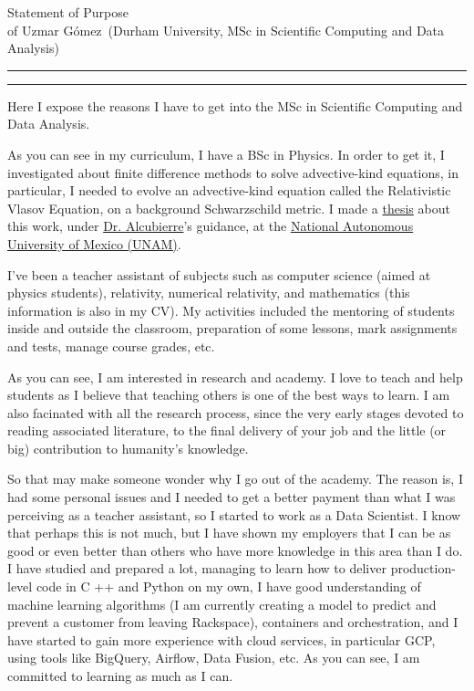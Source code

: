 \documentclass{article}
\newcommand{\soptitle}{Statement of Purpose}
\newcommand{\yourname}{Uzmar G\'omez}
\begin{document}
\begin{center}\LARGE\soptitle\\
\large of \yourname\ (Durham University, MSc in Scientific Computing and Data Analysis)
\end{center}

\hrule
\vspace{1pt}
\hrule height 1pt

\bigskip

Here I expose the reasons I have to get into the MSc in Scientific Computing and Data Analysis.

As you can see in my curriculum,  I have a BSc in Physics. In order to get it, I investigated about finite difference methods to solve advective-kind equations, in particular, I needed to evolve an advective-kind equation called the Relativistic Vlasov Equation, on a background Schwarzschild metric. I made a \href{http://oreon.dgbiblio.unam.mx/F/YF3LAD8UIUFR2XRPDE3H6JM2MI44M8RY8QX1RH7K429163KKEV-19694?func=find-b&request=uzmar&find_code=WRD&adjacent=N&local_base=TES01&x=65&y=13&filter_code_2=WYR&filter_request_2=&filter_code_3=WYR&filter_request_3=}{thesis} about this work, under \href{https://sigi.nucleares.unam.mx/sgiicn/people/user/view/id/8}{Dr. Alcubierre}'s guidance, at the \href{https://www.unam.mx/}{National Autonomous University of Mexico (UNAM)}. 

I've been a teacher assistant of subjects such as computer science (aimed at physics students), relativity, numerical relativity, and mathematics (this information is also in my CV). My activities included the mentoring of students inside and outside the classroom, preparation of some lessons, mark assignments and tests, manage course grades, etc. 

As you can see, I am interested in research and academy. I love to teach and help students as I believe that teaching others is one of the best ways to learn. I am also facinated with all the research process, since the very early stages devoted to reading associated literature, to the final delivery of your job and the little (or big) contribution to humanity's knowledge. 

So that may make someone wonder why I go out of the academy. The reason is, I had some personal issues and I needed to get a better payment than what I was perceiving as a teacher assistant, so I started to work as a Data Scientist. I know that perhaps this is not much, but I have shown my employers that I can be as good or even better than others who have more knowledge in this area than I do. I have studied and prepared a lot, managing to learn how to deliver production-level code in C ++ and Python on my own, I have good understanding of machine learning algorithms (I am currently creating a model to predict and prevent a customer from leaving Rackspace), containers and orchestration, and I have started to gain more experience with cloud services, in particular GCP, using tools like BigQuery, Airflow, Data Fusion, etc. As you can see, I am committed to learning as much as I can.
\end{document}
